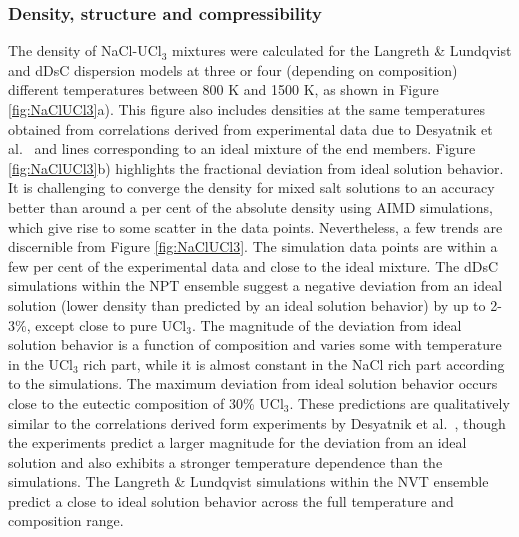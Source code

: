 \documentclass[preprint,3p,10pt,twocolumn,number,sort&compress]{elsarticle}
\begin{document}
\subsubsection{Density, structure and compressibility}
The density of NaCl-UCl$_3$ mixtures were calculated for the Langreth \& Lundqvist and dDsC dispersion models at three or four (depending on composition) different temperatures between 800 K and 1500 K, as shown in Figure \ref{fig:NaClUCl3}a). This figure also includes densities at the same temperatures obtained from correlations derived from experimental data due to Desyatnik et al.~\cite{} and lines corresponding to an ideal mixture of the end members. Figure \ref{fig:NaClUCl3}b) highlights the fractional deviation from ideal solution behavior. 
It is challenging to converge the density for mixed salt solutions to an accuracy better than around a per cent of the absolute density using AIMD simulations, which give rise to some scatter in the data points. Nevertheless, a few trends are discernible from Figure \ref{fig:NaClUCl3}. The simulation data points are within a few per cent of the experimental data and close to the ideal mixture. The dDsC simulations within the NPT ensemble suggest a negative deviation from an ideal solution (lower density than predicted by an ideal solution behavior) by up to 2-3\%, except close to pure UCl$_3$. The magnitude of the deviation from ideal solution behavior is a function of composition and varies some with temperature in the UCl$_3$ rich part, while it is almost constant in the NaCl rich part according to the simulations. 
The maximum deviation from ideal solution behavior occurs close to the eutectic composition of 30\% UCl$_3$. These predictions are qualitatively similar to the correlations derived form experiments by Desyatnik et al.~\cite{}, though the experiments predict a larger magnitude for the deviation from an ideal solution and also exhibits a stronger temperature dependence than the simulations. The Langreth \& Lundqvist simulations within the NVT ensemble predict a close to ideal solution behavior across the full temperature and composition range.
\end{document}
